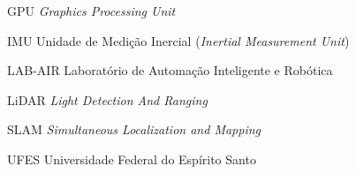 \documentclass[
	12pt,				%
	openright,			%
	oneside,			%
	a4paper,			%
	chapter=TITLE,		%
	english,			%
	french,				%
	spanish,			%
	brazil				%
	]{abntex2}
\begin{document}
\begin{siglas}
\item[GPU] \textit{Graphics Processing Unit} 
\item[IMU]  Unidade de Medição Inercial (\textit{Inertial Measurement Unit})
\item[LAB-AIR] Laboratório de Automação Inteligente e Robótica
\item[LiDAR] \textit{Light Detection And Ranging}
\item[SLAM] \textit{Simultaneous Localization and Mapping}
\item[UFES] Universidade Federal do Espírito Santo
\end{siglas}



\end{document}
